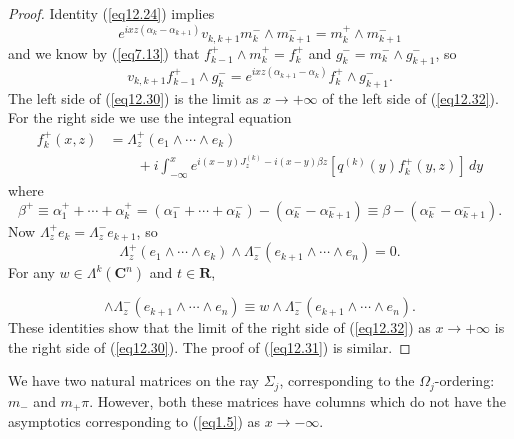 \documentclass{surv-l}
\theoremstyle{plain}
\theoremstyle{definition}
\numberwithin{equation}{chapter}
\begin{document}
\begin{proof}
Identity (\ref{eq12.24}) implies
\begin{equation*}
e^{ixz(\alpha_{k}-\alpha_{k+1} )}v_{k, k+1}m_{k}^{-}\wedge m_{k+1}^{-}=m_{k}^{+}\wedge m_{k+1}^{-}
\end{equation*}
and we know by (\ref{eq7.13}) that $f_{k-1}^{+}\wedge m_{k}^{+}=f_{k}^{+}$ and $g_{k}^{-}=m_{k}^{-}\wedge g_{k+1}^{-}$, so
\begin{equation}\label{eq12.32}
v_{k,k+1}f_{k-1}^{+}\wedge g_{k}^{-}=e^{ixz(\alpha_{k+1}-\alpha_{k})}f_{k}^{+}\wedge g_{k+1}^{-}.
\end{equation}
The left side of (\ref{eq12.30}) is the limit as $ x\rightarrow +\infty$ of the left side of (\ref{eq12.32}). For the right side we use the integral equation
\begin{align*}
f_{k}^{+}(x, z)&=\Lambda_{z}^{+}(e_{1}\wedge\cdots\wedge e_{k})\\
&\qquad+i\int_{-\infty}^{x}e^{i(x-y)J_{z}^{(k)}-i(x-y)\beta z}[q^{(k)}(y)f_{k}^{+}(y, z)]\,dy
\end{align*}
where
\begin{equation*}
\beta^{+}\equiv\alpha_{1}^{+}+\cdots+\alpha_{k}^{+}= (\alpha_{1}^{-}+\cdots+\alpha_{k}^{-})-(\alpha_{k}^{-}-\alpha_{k+1}^{-})\equiv\beta-(\alpha_{k}^{-}-\alpha_{k+1}^{-}).
\end{equation*}
Now $\Lambda_{z}^{+}e_{k}=\Lambda_{z}^{-}e_{k+1}$, so
\begin{equation*}
\Lambda_{z}^{+}(e_{1}\wedge\cdots\wedge e_{k})\wedge\Lambda_{z}^{-}(e_{k+1}\wedge\cdots \wedge e_{n})=0.
\end{equation*}
For any $w\in\Lambda^{k}(\mathbf{C}^{n})$ and $t\in \mathbf{R}$,

\begin{equation*}
[e^{tJ_{k}^{(z)}-t\beta z}w]\wedge\Lambda_{z}^{-}(e_{k+1}\wedge\cdots\wedge e_{n})\equiv w\wedge\Lambda_{z}^{-}(e_{k+1}\wedge\cdots\wedge e_{n}).
\end{equation*}
These identities show that the limit of the right side of (\ref{eq12.32}) as $ x\rightarrow +\infty$ is the right side of (\ref{eq12.30}). The proof of (\ref{eq12.31}) is similar.
\end{proof}
We have two natural matrices on the ray $\Sigma_{j}$, corresponding to the $\Omega_{j}$-ordering: $m_{-}$ and $ m_{+}\pi$. However, both these matrices have columns which do not have the asymptotics corresponding to (\ref{eq1.5}) as $ x\rightarrow-\infty$.
\setcounter{theorem}{32}
\end{document}

